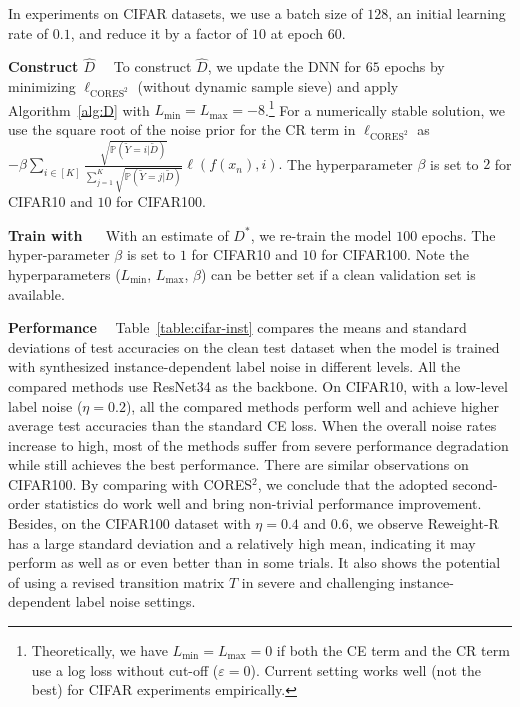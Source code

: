 \documentclass[final]{cvpr}
\newcommand{\estD}{{\hat D}}
\newcommand{\PP}{\mathbb P}
\newcommand{\SPL}{CORES$^2$}
\newcommand{\covpeer}{\text{CAL}}
\begin{document}
In experiments on CIFAR datasets, we use a batch size of $128$, an initial learning rate of $0.1$, and reduce it by a factor of $10$ at epoch $60$.

\noindent\textbf{Construct $\estD$}~~
To construct $\estD$, we update the DNN for $65$ epochs by minimizing $\ell_{\text{CORES}^2}$ (without dynamic sample sieve) and apply Algorithm~\ref{alg:D} with $L_{\min} = L_{\max} = -8$.\footnote{Theoretically, we have $L_{\min} = L_{\max} = 0$ if both the CE term and the CR term use a log loss without cut-off ($\varepsilon=0$). Current setting works well (not the best) for CIFAR experiments empirically.}
For a numerically stable solution, we use the square root of the noise prior for the CR term in $\ell_{\text{CORES}^2}$ as $- \beta   \sum_{i\in[K]} \frac{\sqrt{\PP(\widetilde Y = i|\widetilde{D})}}
{\sum_{j=1}^K \sqrt{\PP(\widetilde Y = j|\widetilde{D})}} \ell(f(x_n),i).$
The hyperparameter $\beta$ is set to $2$ for CIFAR10 and $10$ for CIFAR100.

\noindent\textbf{Train with \covpeer{}}~~
With an estimate of $D^*$, we re-train the model $100$ epochs.
The hyper-parameter $\beta$ is set to $1$ for CIFAR10 and $10$ for CIFAR100.
Note the hyperparameters ($L_{\min}$, $L_{\max}$, $\beta$) can be better set if a clean validation set is available.

\noindent\textbf{Performance}~~
Table~\ref{table:cifar-inst} compares the means and standard deviations of test accuracies on the clean test dataset when the model is trained with synthesized instance-dependent label noise in different levels. 
All the compared methods use ResNet34 as the backbone.
On CIFAR10, with a low-level label noise ($\eta=0.2$), all the compared methods perform well and achieve higher average test accuracies than the standard CE loss.
When the overall noise rates increase to high, most of the methods suffer from severe performance degradation while \covpeer{} still achieves the best performance.
There are similar observations on CIFAR100.
By comparing \covpeer{} with \SPL{}, we conclude that the adopted second-order statistics do work well and bring non-trivial performance improvement. 
Besides, on the CIFAR100 dataset with $\eta=0.4$ and $0.6$, we observe Reweight-R \cite{xia2019anchor} has a large standard deviation and a relatively high mean, indicating it may perform as well as or even better than \covpeer{} in some trials. 
It also shows the potential of using a revised transition matrix $T$ \cite{xia2019anchor} in severe and challenging instance-dependent label noise settings.
\end{document}
